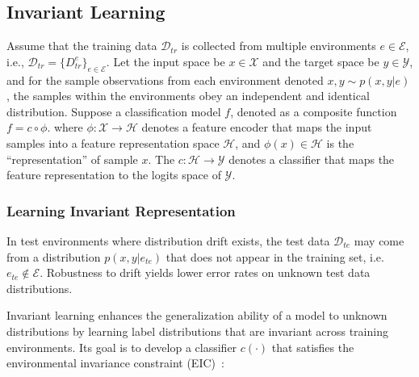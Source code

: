 \subsection{Invariant Learning}
\label{invariant_learning}
Assume that the training data $\mathcal{D}_{tr}$ is collected from multiple environments $e \in \mathcal{E}$, i.e., $\mathcal{D}_{tr}=\{D^e_{tr}\}_{e \in \mathcal{E}}$. Let the input space be $x \in \mathcal{X}$ and the target space be $y \in \mathcal{Y}$, and for the sample observations from each environment denoted $x,y \sim p(x,y|e)$, the samples within the environments obey an independent and identical distribution. Suppose a classification model $f$, denoted as a composite function $f=c \circ \phi$. where $\phi:\mathcal{X} \rightarrow \mathcal{H}$ denotes a feature encoder that maps the input samples into a feature representation space $\mathcal{H}$, and $\phi(x) \in \mathcal{H}$ is the ``representation'' of sample $x$. The $c:\mathcal{H} \rightarrow \mathcal{Y}$ denotes a classifier that maps the feature representation to the logits space of $\mathcal{Y}$. 


\subsubsection{Learning Invariant Representation}
In test environments where distribution drift exists, the test data $\mathcal{D}_{te}$ may come from a distribution $p(x,y|e_{te})$ that does not appear in the training set, i.e. $e_{te} \notin \mathcal{E}$. Robustness to drift yields lower error rates on unknown test data distributions.

Invariant learning enhances the generalization ability of a model to unknown distributions by learning label distributions that are invariant across training environments. Its goal is to develop a classifier $c(\cdot)$ that satisfies the environmental invariance constraint (EIC)~\cite{EIC}:


